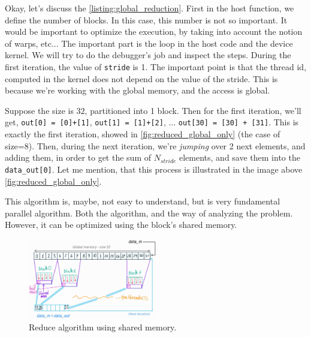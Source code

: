 Okay, let's discuss the \autoref{listing:global_reduction}. First in the host function, we define the number of blocks. 
In this case, this number is not so important. It would be important to optimize the execution, 
by taking into account the notion of warps, etc... The important part is the loop in the host code and 
the device kernel. We will try to do the debugger's job and inspect the steps. 
During the first iteration, the value of \verb|stride| is 1. The important point is that the thread id, 
computed in the kernel does not depend on the value of the stride. This is because we're working with the global 
memory, and the access is global.

Suppose the size is $32$, partitioned into 1 block. Then for the first iteration, we'll get, 
\verb|out[0] = [0]+[1]|, \verb|out[1] = [1]+[2]|, ... \verb|out[30] = [30] + [31]|. This is exactly the first iteration, 
showed in \autoref{fig:reduced_global_only} (the case of size=8). Then, during the next iteration, we're 
\textit{jumping} over 2 next elements, and adding them, in order to get the sum of $N_{stride}$ elements, and save them 
into the \verb|data_out[0]|. Let me mention, that this process is illustrated in the image above \autoref{fig:reduced_global_only}.

This algorithm is, maybe, not easy to understand, but is very fundamental parallel algorithm. Both the algorithm, and the 
way of analyzing the problem. However, it can be optimized using the block's shared memory.


\begin{figure}
   \vspace{-0.9cm}
   \begin{center}
   \includegraphics[width=0.5\textwidth]{pngs/shared_reduce.jpg}
   \end{center}
   \vspace{-0.5cm}
   \captionsetup{justification=raggedleft}
   \caption{Reduce algorithm using shared memory.}
   \label{fig:shared_reduce}
\end{figure}



